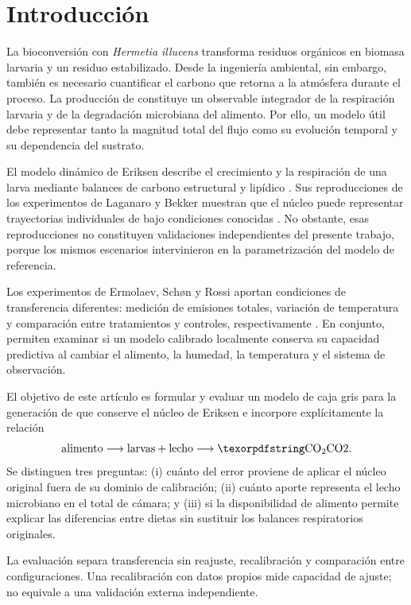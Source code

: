 \section{Introducción}

La bioconversión con \textit{Hermetia illucens} transforma residuos
orgánicos en biomasa larvaria y un residuo estabilizado. Desde la
ingeniería ambiental, sin embargo, también es necesario cuantificar el
carbono que retorna a la atmósfera durante el proceso. La producción de
\co{} constituye un observable integrador de la respiración larvaria y
de la degradación microbiana del alimento. Por ello, un modelo útil debe
representar tanto la magnitud total del flujo como su evolución temporal
y su dependencia del sustrato.

El modelo dinámico de Eriksen describe el crecimiento y la respiración
de una larva mediante balances de carbono estructural y lipídico
\cite{eriksenDynamicModellingFeed2022}. Sus reproducciones de los
experimentos de Laganaro y Bekker muestran que el núcleo puede
representar trayectorias individuales de \co{} bajo condiciones
conocidas \cite{laganaroGrowthMetabolicPerformance2021a,
bekkerImpactSubstrateMoisture2021a}. No obstante, esas reproducciones
no constituyen validaciones independientes del presente trabajo, porque
los mismos escenarios intervinieron en la parametrización del modelo de
referencia.

Los experimentos de Ermolaev, Schøn y Rossi aportan condiciones de
transferencia diferentes: medición de emisiones totales, variación de
temperatura y comparación entre tratamientos y controles,
respectivamente \cite{ermolaevGreenhouseGasEmissions2019,
schonEffectTemperatureGrowth2024,
rossiEstimatingDynamicsGreenhouse2024a}. En conjunto, permiten examinar
si un modelo calibrado localmente conserva su capacidad predictiva al
cambiar el alimento, la humedad, la temperatura y el sistema de
observación.

El objetivo de este artículo es formular y evaluar un modelo de caja
gris para la generación de \co{} que conserve el núcleo de Eriksen e
incorpore explícitamente la relación
\[
\text{alimento}\longrightarrow
\text{larvas}+\text{lecho}\longrightarrow \text{\co{}}.
\]
Se distinguen tres preguntas: (i) cuánto del error proviene de aplicar
el núcleo original fuera de su dominio de calibración; (ii) cuánto
aporte representa el lecho microbiano en el total de cámara; y (iii) si
la disponibilidad de alimento permite explicar las diferencias entre
dietas sin sustituir los balances respiratorios originales.

La evaluación separa transferencia sin reajuste, recalibración y
comparación entre configuraciones. Una recalibración con datos propios
mide capacidad de ajuste; no equivale a una validación externa
independiente.
